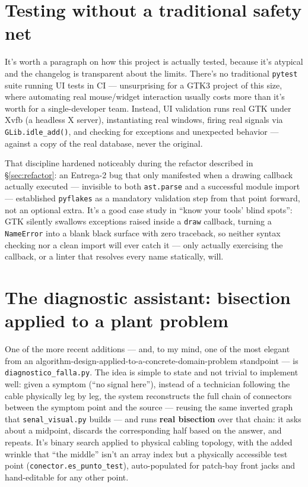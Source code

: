 \documentclass[10.4pt,twocolumn]{article}
\begin{document}
\section{Testing without a traditional safety net}

It's worth a paragraph on how this project is actually tested, because it's atypical and the changelog is transparent about the limits. There's no traditional \texttt{pytest} suite running UI tests in CI --- unsurprising for a GTK3 project of this size, where automating real mouse/widget interaction usually costs more than it's worth for a single-developer team. Instead, UI validation runs real GTK under Xvfb (a headless X server), instantiating real windows, firing real signals via \texttt{GLib.idle\_add()}, and checking for exceptions and unexpected behavior --- against a copy of the real database, never the original.

That discipline hardened noticeably during the refactor described in \S\ref{sec:refactor}: an Entrega-2 bug that only manifested when a drawing callback actually executed --- invisible to both \texttt{ast.parse} and a successful module import --- established \texttt{pyflakes} as a mandatory validation step from that point forward, not an optional extra. It's a good case study in ``know your tools' blind spots'': GTK silently swallows exceptions raised inside a \texttt{draw} callback, turning a \texttt{NameError} into a blank black surface with zero traceback, so neither syntax checking nor a clean import will ever catch it --- only actually exercising the callback, or a linter that resolves every name statically, will.

\section{The diagnostic assistant: bisection applied to a plant problem}

One of the more recent additions --- and, to my mind, one of the most elegant from an algorithm-design-applied-to-a-concrete-domain-problem standpoint --- is \texttt{diagnostico\_falla.py}. The idea is simple to state and not trivial to implement well: given a symptom (``no signal here''), instead of a technician following the cable physically leg by leg, the system reconstructs the full chain of connectors between the symptom point and the source --- reusing the same inverted graph that \texttt{senal\_visual.py} builds --- and runs \textbf{real bisection} over that chain: it asks about a midpoint, discards the corresponding half based on the answer, and repeats. It's binary search applied to physical cabling topology, with the added wrinkle that ``the middle'' isn't an array index but a physically accessible test point (\texttt{conector.es\_punto\_test}), auto-populated for patch-bay front jacks and hand-editable for any other point.
\end{document}
